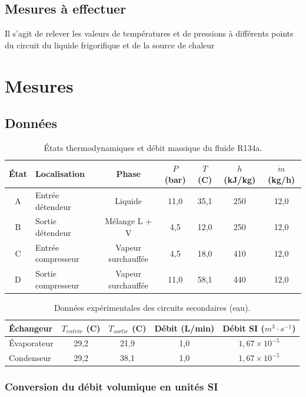 \documentclass[a4paper,10pt,french]{scrartcl}
\begin{document}
\subsection{Mesures à effectuer}
Il s'agit de relever les valeurs de températures et de pressions à différents points du circuit du liquide frigorifique et de la source de chaleur
\section{Mesures}
\subsection{Données}

\begin{table}[h!]
\centering
\renewcommand{\arraystretch}{1.3}
\begin{tabular}{|c|l|c|c|c|c|c|}
\hline
{État} & {Localisation} & {Phase} & {$P$ (bar)} & {$T$ (C)} & {$h$ (kJ/kg)} & {$\dot{m}$ (kg/h)} \\ \hline
{A} & Entrée détendeur & Liquide & 11,0 & 35,1 & 250 & 12,0 \\ \hline
{B} & Sortie détendeur & Mélange L + V & 4,5 & 12,0 & 250 & 12,0 \\ \hline
{C} & Entrée compresseur & Vapeur surchauffée & 4,5 & 18,0 & 410 & 12,0 \\ \hline
{D} & Sortie compresseur & Vapeur surchauffée & 11,0 & 58,1 & 440 & 12,0 \\ \hline
\end{tabular}
\caption{États thermodynamiques et débit massique du fluide R134a.}
\end{table}

\begin{table}[h!]
\centering
\renewcommand{\arraystretch}{1.5}
\begin{tabular}{|l|c|c|c|c|}
\hline
{Échangeur} & {$T_{entrée}$ (C)} & {$T_{sortie}$ (C)} & {Débit (L/min)} & {Débit SI ($m^3 \cdot s^{-1}$)} \\ \hline
{Évaporateur} & 29,2 & 21,9 & 1,0 & $1,67 \times 10^{-5}$ \\ \hline
{Condenseur} & 29,2 & 38,1 & 1,0 & $1,67 \times 10^{-5}$ \\ \hline
\end{tabular}
\caption{Données expérimentales des circuits secondaires (eau).}
\end{table}

\subsubsection{Conversion du débit volumique en unités SI}
\end{document}
